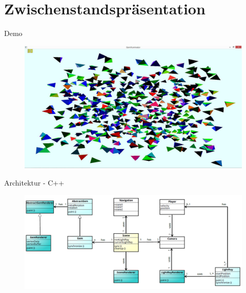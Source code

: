 

\subtitle{Game Programming}



\slidetitle
\section*{Zwischenstandspräsentation}

\begin{frame}{Demo}
	\begin{figure}
		\centering
		\includegraphics[width=\textwidth, height=0.7\textheight, keepaspectratio]{images/500_gems_intel}
	\end{figure}
\end{frame}


\begin{frame}{Architektur - C++}
	\begin{figure}
		\centering
		\includegraphics[width=\textwidth, height=\textheight, keepaspectratio]{images/klassendiagramm}
	\end{figure}
\end{frame}



